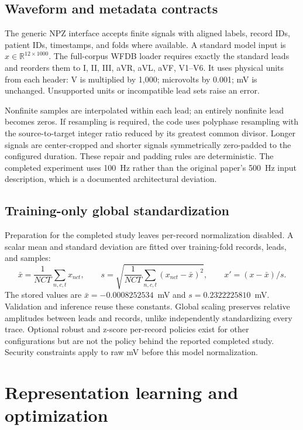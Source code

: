 \documentclass[11pt,a4paper]{article}
\begin{document}
\subsection{Waveform and metadata contracts}
The generic NPZ interface accepts finite signals with aligned labels, record IDs, patient IDs, timestamps, and folds where available. A standard model input is $x\in\mathbb{R}^{12\times1000}$. The full-corpus WFDB loader requires exactly the standard leads and reorders them to I, II, III, aVR, aVL, aVF, V1--V6. It uses physical units from each header: V is multiplied by 1,000; microvolts by 0.001; mV is unchanged. Unsupported units or incompatible lead sets raise an error.

Nonfinite samples are interpolated within each lead; an entirely nonfinite lead becomes zeros. If resampling is required, the code uses polyphase resampling with the source-to-target integer ratio reduced by its greatest common divisor. Longer signals are center-cropped and shorter signals symmetrically zero-padded to the configured duration. These repair and padding rules are deterministic. The completed experiment uses 100~Hz rather than the original paper's 500~Hz input description, which is a documented architectural deviation.

\subsection{Training-only global standardization}
Preparation for the completed study leaves per-record normalization disabled. A scalar mean and standard deviation are fitted over training-fold records, leads, and samples:
\begin{equation}
\bar{x}=\frac{1}{NCT}\sum_{n,c,t}x_{nct},\qquad
s=\sqrt{\frac{1}{NCT}\sum_{n,c,t}(x_{nct}-\bar{x})^2},\qquad
x'=(x-\bar{x})/s.
\end{equation}
The stored values are $\bar{x}=-0.0008252534$~mV and $s=0.2322225810$~mV. Validation and inference reuse these constants. Global scaling preserves relative amplitudes between leads and records, unlike independently standardizing every trace. Optional robust and z-score per-record policies exist for other configurations but are not the policy behind the reported completed study. Security constraints apply to raw mV before this model normalization.

\section{Representation learning and optimization}
\label{sec:representation}
\end{document}
